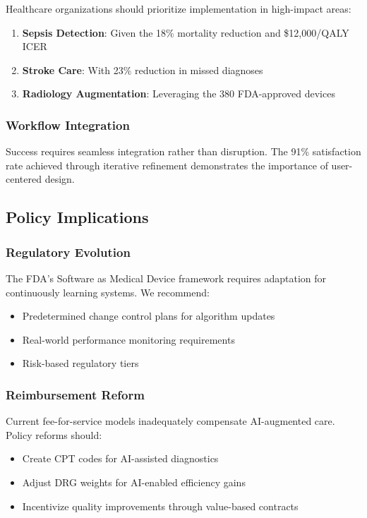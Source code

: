\documentclass[12pt,letterpaper]{article}
\begin{document}
Healthcare organizations should prioritize implementation in high-impact areas:
\begin{enumerate}
\item \textbf{Sepsis Detection}: Given the 18\% mortality reduction and \$12,000/QALY ICER
\item \textbf{Stroke Care}: With 23\% reduction in missed diagnoses
\item \textbf{Radiology Augmentation}: Leveraging the 380 FDA-approved devices
\end{enumerate}

\subsubsection{Workflow Integration}

Success requires seamless integration rather than disruption. The 91\% satisfaction rate achieved through iterative refinement demonstrates the importance of user-centered design.

\subsection{Policy Implications}

\subsubsection{Regulatory Evolution}

The FDA's Software as Medical Device framework requires adaptation for continuously learning systems. We recommend:
\begin{itemize}
\item Predetermined change control plans for algorithm updates
\item Real-world performance monitoring requirements
\item Risk-based regulatory tiers
\end{itemize}

\subsubsection{Reimbursement Reform}

Current fee-for-service models inadequately compensate AI-augmented care. Policy reforms should:
\begin{itemize}
\item Create CPT codes for AI-assisted diagnostics
\item Adjust DRG weights for AI-enabled efficiency gains
\item Incentivize quality improvements through value-based contracts
\end{itemize}
\end{document}
